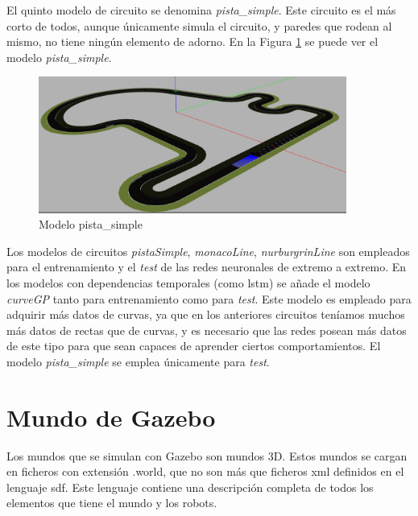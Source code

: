 El quinto modelo de circuito se denomina \textit{ pista\_simple}. Este circuito es el más corto de todos, aunque únicamente simula el circuito, y paredes que rodean al mismo, no tiene ningún elemento de adorno. En la Figura \ref{fig.small} se puede ver el modelo \textit{pista\_simple}.\\

\begin{figure}[H]
  \begin{center}
    \includegraphics[width=0.9\textwidth]{figures/Infraestructura/circuit_Small.png}
		\caption{Modelo pista\_simple}
		\label{fig.small}
		\end{center}
\end{figure}


Los modelos de circuitos \textit{pistaSimple}, \textit{monacoLine}, \textit{nurburgrinLine} son empleados para el entrenamiento y el \textit{test} de las redes neuronales de extremo a extremo. En los modelos con dependencias temporales (como \acrshort{lstm}) se añade el modelo \textit{curveGP} tanto para entrenamiento como para \textit{test}. Este modelo es empleado para adquirir más datos de curvas, ya que en los anteriores circuitos teníamos muchos más datos de rectas que de curvas, y es necesario que las redes posean más datos de este tipo para que sean capaces de aprender ciertos comportamientos. El modelo \textit{pista\_simple} se emplea únicamente para \textit{test}.\\



\section{Mundo de Gazebo}\label{mundo}

Los mundos que se simulan con Gazebo son mundos 3D. Estos mundos se cargan en ficheros con extensión .world, que no son más que ficheros \acrshort{xml} definidos en el lenguaje \acrshort{sdf}. Este lenguaje contiene una descripción completa de todos los elementos que tiene el mundo y los robots.\\

